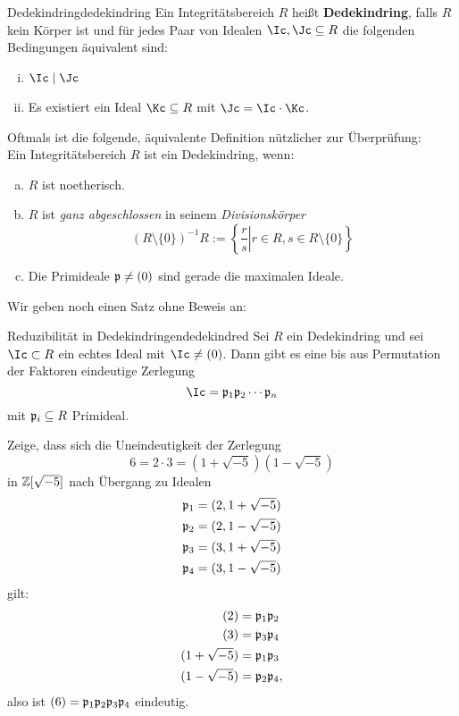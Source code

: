 \begin{definition}{Dedekindring}{dedekindring}
Ein Integritätsbereich $R$ heißt \textbf{Dedekindring}, falls $R$ kein Körper ist und für jedes Paar von Idealen $\Ic, \Jc \sub R$ die folgenden Bedingungen äquivalent sind:
\begin{enumerate}[(i)]
\item $\Ic \mid \Jc$
\item Es existiert ein Ideal $\Kc \sub R$ mit $\Jc = \Ic \cdot \Kc$.
\end{enumerate}
\end{definition}
\begin{bemerkung}
Oftmals ist die folgende, äquivalente Definition nützlicher zur Überprüfung:\\
Ein Integritätsbereich $R$ ist ein Dedekindring, wenn:
\begin{enumerate}[(a)]
\item $R$ ist noetherisch.
\item $R$ ist \textit{ganz abgeschlossen} in seinem \textit{Divisionskörper} 
\begin{equation}
(R \setminus \{0\})^{-1}R := \left\{ \left. \frac{r}{s} \right| r \in R, s \in R \setminus \{0\}\right\}
\end{equation}
\item Die Primideale $\mathfrak{p} \neq (0)$ sind gerade die maximalen Ideale.
\end{enumerate}
\end{bemerkung}
Wir geben noch einen Satz ohne Beweis an:
\begin{satz}{Reduzibilität in Dedekindringen}{dedekindred}
Sei $R$ ein Dedekindring und sei $\Ic \subset R$ ein echtes Ideal mit $\Ic \neq (0)$. Dann gibt es eine bis aus Permutation der Faktoren eindeutige Zerlegung
\begin{equation}
\Ic = \fp_1 \fp_2 \cdots \fp_n
\end{equation}
mit $\mathfrak{p}_i \subseteq R$ Primideal.
\end{satz}
\begin{übung}
Zeige, dass sich die Uneindeutigkeit der Zerlegung
\begin{equation}
6 = 2 \cdot 3 = (1+\sqrt{-5})(1-\sqrt{-5})
\end{equation}
in $\mathbb{Z}[\sqrt{-5}]$ nach Übergang zu Idealen
\begin{equation}
\begin{split}
\mathfrak{p}_1 &= (2, 1+\sqrt{-5})\\
\mathfrak{p}_2 &= (2, 1-\sqrt{-5})\\
\mathfrak{p}_3 &= (3, 1+\sqrt{-5})\\
\mathfrak{p}_4 &= (3, 1-\sqrt{-5})
\end{split}
\end{equation}
gilt:
\begin{equation}
\begin{split}
(2) &= \mathfrak{p}_1 \mathfrak{p}_2\\
(3) &= \mathfrak{p}_3 \mathfrak{p}_4\\
(1+\sqrt{-5}) &= \mathfrak{p}_1 \mathfrak{p}_3\\
(1-\sqrt{-5}) &= \mathfrak{p}_2 \mathfrak{p}_4,
\end{split}
\end{equation}
also ist $(6) = \mathfrak{p}_1 \mathfrak{p}_2 \mathfrak{p}_3 \mathfrak{p}_4$ eindeutig.
\end{übung}

